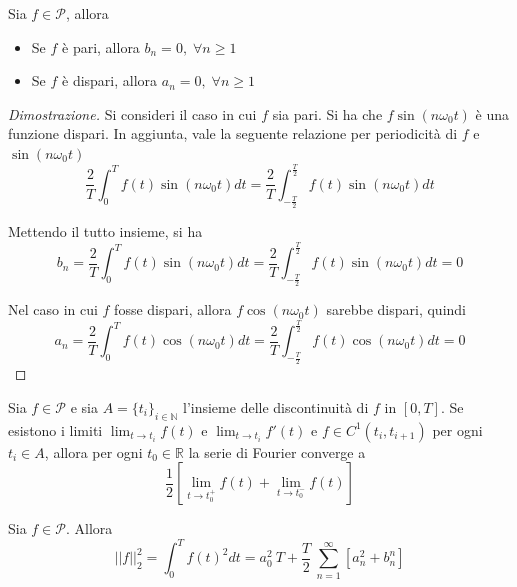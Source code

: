     \begin{proposition}
        Sia $f \in \mathcal{P}$, allora
        \begin{itemize}
            \item Se $f$ è pari, allora $b_{n} = 0, \; \forall n \geq 1$
            \item Se $f$ è dispari, allora $a_{n} = 0, \; \forall n \geq 1$
        \end{itemize}
    \end{proposition}

    \begin{proof}[Dimostrazione]
        Si consideri il caso in cui $f$ sia pari.
        Si ha che $f \sin(n\omega_{0}t)$ è una funzione dispari.
        In aggiunta, vale la seguente relazione per periodicità di $f$ e $\sin(n\omega_{0}t)$
        \[
            \frac{2}{T} \int_{0}^{T} f(t)\sin(n \omega_{0} t) dt = \frac{2}{T} \int_{-\frac{T}{2}}^{\frac{T}{2}} f(t)\sin(n \omega_{0} t) dt
        \]

        Mettendo il tutto insieme, si ha
        \[
            b_{n} = \frac{2}{T} \int_{0}^{T} f(t)\sin(n \omega_{0} t) dt = \frac{2}{T} \int_{-\frac{T}{2}}^{\frac{T}{2}} f(t)\sin(n \omega_{0} t) dt = 0
        \]

        Nel caso in cui $f$ fosse dispari, allora $f \cos(n \omega_{0} t)$ sarebbe dispari, quindi
        \[
            a_{n} = \frac{2}{T} \int_{0}^{T} f(t)\cos(n \omega_{0} t) dt = \frac{2}{T} \int_{-\frac{T}{2}}^{\frac{T}{2}} f(t)\cos(n \omega_{0} t) dt = 0
        \]
    \end{proof}

    \begin{theorem}
        Sia $f \in \mathcal{P}$ e sia $A = \{t_{i}\}_{i \in \mathbb{N}}$ l'insieme delle discontinuità di $f$ in $[0, T]$.
        Se esistono i limiti $\displaystyle \lim_{t \rightarrow t_{i}} f(t)$ e $\displaystyle \lim_{t \rightarrow t_{i}} f'(t)$ e $f \in C^{1}(t_{i}, t_{i + 1})$ per ogni $t_{i} \in A$, allora per ogni $t_{0} \in \mathbb{R}$ la serie di Fourier converge a
        \[
            \frac{1}{2} \left[ \lim_{t \rightarrow t_{0}^{+}} f(t) + \lim_{t \rightarrow t_{0}^{-}} f(t) \right]
        \]
    \end{theorem}

    \begin{theorem}
        Sia $f \in \mathcal{P}$. Allora
        \[
            ||f||^{2}_{2} = \int_{0}^{T} f(t)^{2} dt = a_{0}^{2} \: T + \frac{T}{2} \: \sum_{n = 1}^{\infty} \left[a_{n}^{2} + b_{n}^{n}\right]
        \]
    \end{theorem}

